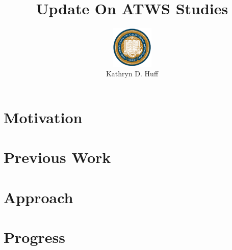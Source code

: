 \documentclass[serif]{beamer}
\begin{document}
\title{Update On ATWS Studies}
\author[Kathryn D. Huff]{\includegraphics[height=2cm]{bk}\\Kathryn D.  Huff}
\maketitle

\section{Motivation}

\section{Previous Work}

\section{Approach}

\section{Progress}

\end{document}
